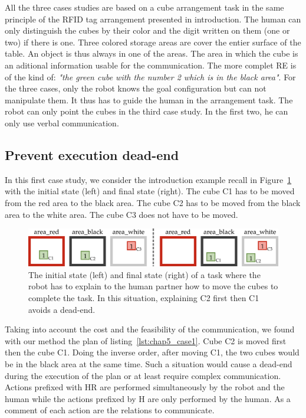 All the three cases studies are based on a cube arrangement task in the same principle of the RFID tag arrangement presented in introduction. The human can only distinguish the cubes by their color and the digit written on them (one or two) if there is one. Three colored storage areas are cover the entier surface of the table. An object is thus always in one of the areas. The area in which the cube is an aditional information usable for the communication. The more complet RE is of the kind of: \textit{"the green cube with the number 2 which is in the black area"}. For the three cases, only the robot knows the goal configuration but can not manipulate them. It thus has to guide the human in the arrangement task. The robot can only point the cubes in the third case study. In the first two, he can only use verbal communication.

\subsection{Prevent execution dead-end}

In this first case study, we consider the introduction example recall in Figure~\ref{fig:chap5_case1} with the initial state (left) and final state (right). The cube C1 has to be moved from the red area to the black area. The cube C2 has to be moved from the black area to the white area. The cube C3 does not have to be moved.

\begin{figure}[!ht]
\centering
\includegraphics[width=\textwidth]{figures/chapter5/results_case1.png}
\caption{\label{fig:chap5_case1} The initial state (left) and final state (right) of a task where the robot has to explain to the human partner how to move the cubes to complete the task. In this situation, explaining C2 first then C1 avoids a dead-end. }
\end{figure}

Taking into account the cost and the feasibility of the communication, we found with our method the plan of listing~\ref{lst:chap5_case1}. Cube C2 is moved first then the cube C1. Doing the inverse order, after moving C1, the two cubes would be in the black area at the same time. Such a situation would cause a dead-end during the execution of the plan or at least require complex communication. Actions prefixed with HR are performed simultaneously by the robot and the human while the actions prefixed by H are only performed by the human. As a comment of each action are the relations to communicate.


